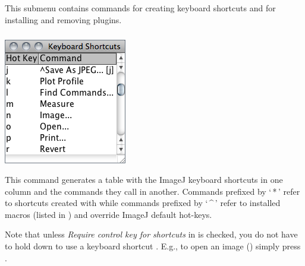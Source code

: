 

\subsection{\protect{}\label{sub:Shortcuts}}

This submenu contains commands for creating keyboard shortcuts
and for installing and removing plugins.




\subsubsection{\protect{}\label{sub:List-Shortcuts...}}

\begin{minipage}[c][1\totalheight][t]{0.305\columnwidth}%
\includegraphics[scale=0.55]{images/ListShortcuts}%
\end{minipage}%
\begin{minipage}[c][1\totalheight][t]{0.695\columnwidth}%
This command generates a table with the ImageJ keyboard shortcuts
in one column and the commands they call in another. Commands prefixed
by `\,{*}\,' refer to shortcuts created with 
while commands prefixed by `\,\textasciicircum{}\,' refer to installed
macros (listed in {\small {}})
and override ImageJ default hot-keys.\medskip{}


Note that unless \emph{Require control key for shortcuts }in \textsf{}
is checked, you do not have to hold down  to use
a keyboard shortcut . E.g., to open an image ({\small {}})
simply press .%
\end{minipage}


